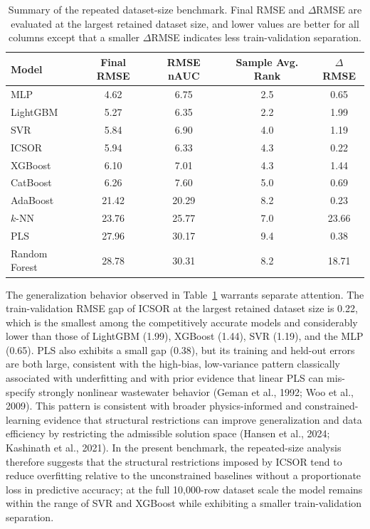 \documentclass[a4paper,fleqn]{cas-sc}
\newenvironment{revblock}{\begingroup\color{revDefault}}{\endgroup}
\newenvironment{revblockr25}{\begingroup\color{revRtwoFive}}{\endgroup}
\begin{document}
\begin{revblock}
\begin{revblockr25}
\begin{table}[htbp]
\centering
\caption{Summary of the repeated dataset-size benchmark. Final RMSE and $\Delta$RMSE are evaluated at the largest retained dataset size, and lower values are better for all columns except that a smaller $\Delta$RMSE indicates less train-validation separation.}
\label{tab:results_scaling_sample}
\scriptsize
\begin{tabular}{lcccc}
\hline
Model & Final RMSE & RMSE nAUC & Sample Avg. Rank & $\Delta$RMSE \\
\hline
MLP & 4.62 & 6.75 & 2.5 & 0.65 \\
LightGBM & 5.27 & 6.35 & 2.2 & 1.99 \\
SVR & 5.84 & 6.90 & 4.0 & 1.19 \\
ICSOR & 5.94 & 6.33 & 4.3 & 0.22 \\
XGBoost & 6.10 & 7.01 & 4.3 & 1.44 \\
CatBoost & 6.26 & 7.60 & 5.0 & 0.69 \\
AdaBoost & 21.42 & 20.29 & 8.2 & 0.23 \\
$k$-NN & 23.76 & 25.77 & 7.0 & 23.66 \\
PLS & 27.96 & 30.17 & 9.4 & 0.38 \\
Random Forest & 28.78 & 30.31 & 8.2 & 18.71 \\
\hline
\end{tabular}
\end{table}

The generalization behavior observed in Table~\ref{tab:results_scaling_sample} warrants separate attention. The train-validation RMSE gap of ICSOR at the largest retained dataset size is 0.22, which is the smallest among the competitively accurate models and considerably lower than those of LightGBM (1.99), XGBoost (1.44), SVR (1.19), and the MLP (0.65). PLS also exhibits a small gap (0.38), but its training and held-out errors are both large, consistent with the high-bias, low-variance pattern classically associated with underfitting and with prior evidence that linear PLS can mis-specify strongly nonlinear wastewater behavior (Geman et al., 1992; Woo et al., 2009). This pattern is consistent with broader physics-informed and constrained-learning evidence that structural restrictions can improve generalization and data efficiency by restricting the admissible solution space (Hansen et al., 2024; Kashinath et al., 2021). In the present benchmark, the repeated-size analysis therefore suggests that the structural restrictions imposed by ICSOR tend to reduce overfitting relative to the unconstrained baselines without a proportionate loss in predictive accuracy; at the full 10,000-row dataset scale the model remains within the range of SVR and XGBoost while exhibiting a smaller train-validation separation.


\end{revblockr25}
\end{revblock}
\end{document}
